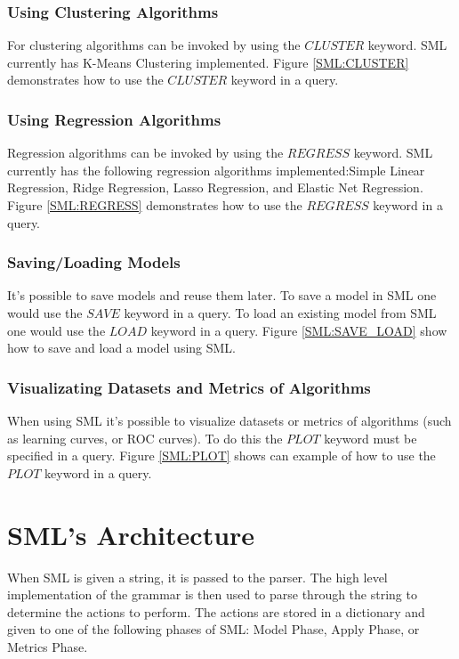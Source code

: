 \documentclass[jair,twoside,11pt,theapa]{article}
\begin{document}
\subsubsection{Using Clustering Algorithms}
For clustering algorithms can be invoked by using the \(CLUSTER\) keyword. SML currently has K-Means Clustering implemented. Figure \ref{SML:CLUSTER} demonstrates how to use the \(CLUSTER\) keyword in a query.

\subsubsection{Using Regression Algorithms}
Regression algorithms can be invoked by using the \(REGRESS\) keyword. SML currently has the following regression algorithms implemented:Simple Linear Regression, Ridge Regression, Lasso Regression, and Elastic Net Regression. Figure \ref{SML:REGRESS} demonstrates how to use the \(REGRESS\) keyword in a query.

\subsubsection{Saving/Loading Models}
It's possible to save models and reuse them later. To save a model in SML one would use the \(SAVE\) keyword in a query. To load an existing model from SML one would use the \(LOAD\) keyword in a query. Figure \ref{SML:SAVE_LOAD} show how to save and load a model using SML.

\subsubsection{Visualizating Datasets and Metrics of Algorithms}
When using SML it's possible to visualize datasets or metrics of algorithms (such as learning curves, or ROC curves). To do this the \(PLOT\) keyword must be specified in a query. Figure \ref{SML:PLOT} shows can example of how to use the \(PLOT\) keyword in a query.

\section{SML's Architecture}
\label{sml-architecture}

When SML is given a string, it is passed to the parser. The high level implementation of the grammar is then used to parse through the string to determine the actions to perform. The actions are stored in a dictionary and given to one of the following phases of SML: Model Phase, Apply Phase, or Metrics Phase.
\end{document}
